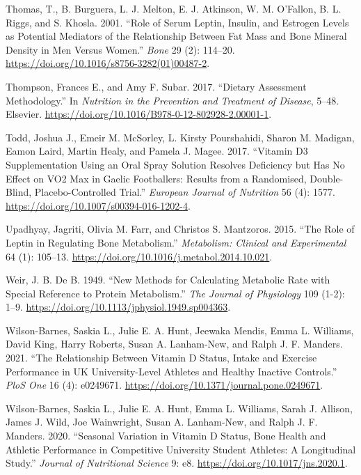 \documentclass[
]{article}
\newlength{\cslhangindent}
\newenvironment{CSLReferences}[2] %
 {\begin{list}{}{%
  \setlength{\itemindent}{0pt}
  \setlength{\leftmargin}{0pt}
  \setlength{\parsep}{0pt}
  \ifodd #1
   \setlength{\leftmargin}{\cslhangindent}
   \setlength{\itemindent}{-1\cslhangindent}
  \fi
  \setlength{\itemsep}{#2\baselineskip}}}
 {\end{list}}
\begin{document}
\begin{CSLReferences}{1}{0}
Thomas, T., B. Burguera, L. J. Melton, E. J. Atkinson, W. M. O'Fallon, B. L. Riggs, and S. Khosla. 2001. {``Role of Serum Leptin, Insulin, and Estrogen Levels as Potential Mediators of the Relationship Between Fat Mass and Bone Mineral Density in Men Versus Women.''} \emph{Bone} 29 (2): 114--20. \url{https://doi.org/10.1016/s8756-3282(01)00487-2}.

Thompson, Frances E., and Amy F. Subar. 2017. {``Dietary {Assessment} {Methodology}.''} In \emph{Nutrition in the {Prevention} and {Treatment} of {Disease}}, 5--48. Elsevier. \url{https://doi.org/10.1016/B978-0-12-802928-2.00001-1}.

Todd, Joshua J., Emeir M. McSorley, L. Kirsty Pourshahidi, Sharon M. Madigan, Eamon Laird, Martin Healy, and Pamela J. Magee. 2017. {``Vitamin {D3} Supplementation Using an Oral Spray Solution Resolves Deficiency but Has No Effect on {VO2} Max in {Gaelic} Footballers: Results from a Randomised, Double-Blind, Placebo-Controlled Trial.''} \emph{European Journal of Nutrition} 56 (4): 1577. \url{https://doi.org/10.1007/s00394-016-1202-4}.

Upadhyay, Jagriti, Olivia M. Farr, and Christos S. Mantzoros. 2015. {``The Role of Leptin in Regulating Bone Metabolism.''} \emph{Metabolism: Clinical and Experimental} 64 (1): 105--13. \url{https://doi.org/10.1016/j.metabol.2014.10.021}.

Weir, J. B. De B. 1949. {``New Methods for Calculating Metabolic Rate with Special Reference to Protein Metabolism.''} \emph{The Journal of Physiology} 109 (1-2): 1--9. \url{https://doi.org/10.1113/jphysiol.1949.sp004363}.

Wilson-Barnes, Saskia L., Julie E. A. Hunt, Jeewaka Mendis, Emma L. Williams, David King, Harry Roberts, Susan A. Lanham-New, and Ralph J. F. Manders. 2021. {``The Relationship Between Vitamin {D} Status, Intake and Exercise Performance in {UK} {University}-Level Athletes and Healthy Inactive Controls.''} \emph{PloS One} 16 (4): e0249671. \url{https://doi.org/10.1371/journal.pone.0249671}.

Wilson-Barnes, Saskia L., Julie E. A. Hunt, Emma L. Williams, Sarah J. Allison, James J. Wild, Joe Wainwright, Susan A. Lanham-New, and Ralph J. F. Manders. 2020. {``Seasonal Variation in Vitamin {D} Status, Bone Health and Athletic Performance in Competitive University Student Athletes: A Longitudinal Study.''} \emph{Journal of Nutritional Science} 9: e8. \url{https://doi.org/10.1017/jns.2020.1}.


\end{CSLReferences}
\end{document}
